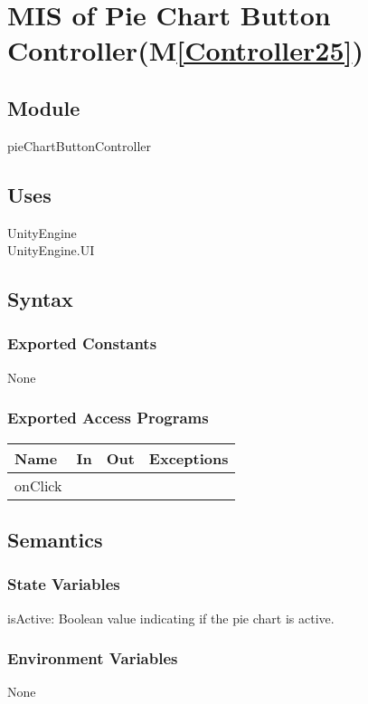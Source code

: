 \documentclass[12pt, titlepage]{article}
\newcommand{\mref}[1]{M\ref{#1}}
\begin{document}
\section{MIS of Pie Chart Button Controller(\mref{Controller25})}  

\subsection{Module}

pieChartButtonController

\subsection{Uses}
UnityEngine\\
UnityEngine.UI\\
\subsection{Syntax}
\subsubsection{Exported Constants}
None
\subsubsection{Exported Access Programs}

\begin{center}
\begin{tabular}{| l | l | l | p{5cm}|}
\hline
\textbf{Name} & \textbf{In} & \textbf{Out} & \textbf{Exceptions} \\
\hline
onClick &  &  &  \\
\hline
\end{tabular}
\end{center}

\subsection{Semantics}

\subsubsection{State Variables}
isActive: Boolean value indicating if the pie chart is active. 

\subsubsection{Environment Variables}
None
\end{document}
